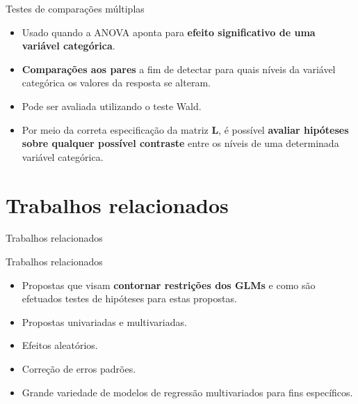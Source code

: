 \documentclass[
  ignorenonframetext,
  serif,
  professionalfont,
  usenames,
  dvipsnames,
  aspectratio = 169]{beamer}
\begin{document}
\begin{frame}{Testes de comparações múltiplas}
\protect\hypertarget{testes-de-comparauxe7uxf5es-muxfaltiplas}{}
\begin{itemize}

  \itemsep 2ex

  \item Usado quando a ANOVA aponta para \textbf{efeito significativo de uma variável categórica}.

  \item \textbf{Comparações aos pares} a fim de detectar para quais níveis da variável categórica os valores da resposta se alteram.

  \item Pode ser avaliada utilizando o teste Wald. 

  \item Por meio da correta especificação da matriz $\boldsymbol{L}$, é possível \textbf{avaliar hipóteses sobre qualquer possível contraste} entre os níveis de uma determinada variável categórica. 

\end{itemize}
\end{frame}

\hypertarget{trabalhos-relacionados}{%
\section{Trabalhos relacionados}\label{trabalhos-relacionados}}

\begin{frame}{Trabalhos relacionados}
\end{frame}

\begin{frame}{Trabalhos relacionados}
\protect\hypertarget{trabalhos-relacionados-1}{}
\begin{itemize}
  \itemsep 2ex
  
  \item Propostas que visam \textbf{contornar restrições dos GLMs} e como são efetuados testes de hipóteses para estas propostas.
  
  \item Propostas univariadas e multivariadas.
  
  \item Efeitos aleatórios.
  
  \item Correção de erros padrões.
  
  \item Grande variedade de modelos de regressão multivariados para fins específicos.
  
\end{itemize}
\end{frame}
\end{document}
